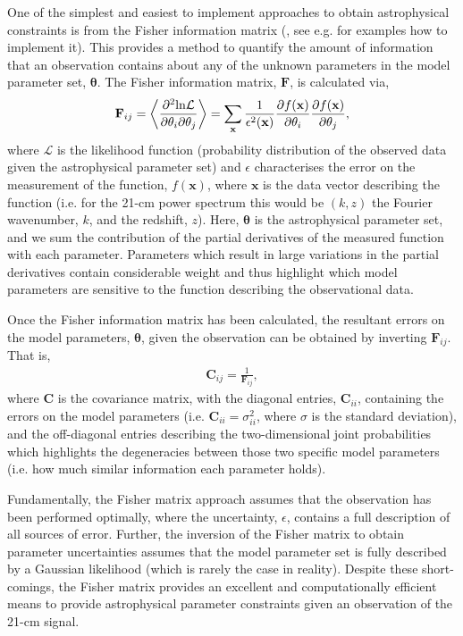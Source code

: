 One of the simplest and easiest to implement approaches to obtain astrophysical constraints is from the Fisher information matrix (\cite{Fisher:1935}, see e.g. \cite{Tegmark:1997,Coe:2009} for examples how to implement it). This provides a method to quantify the amount of information that an observation contains about any of the unknown parameters in the model parameter set, $\mathbf{\theta}$. The Fisher information matrix, $\mathbf{F}$, is calculated via,
\begin{eqnarray}
\mathbf{F}_{ij} = \left\langle \frac{\partial^{2}{\rm ln}\mathcal{L}}{\partial\theta_{i}\partial\theta_{j}} \right\rangle = \sum_{\mathbf{x}} \frac{1}{\epsilon^{2}(\mathbf{x})} \frac{\partial f(\mathbf{x})}{\partial\theta_{i}} \frac{\partial f(\mathbf{x})}{\partial\theta_{j}} ,
\end{eqnarray}
where $\mathcal{L}$ is the likelihood function (probability distribution of the observed data given the astrophysical parameter set) and $\epsilon$ characterises the error on the measurement of the function, $f(\mathbf{x})$, where $\mathbf{x}$ is the data vector describing the function (i.e. for the 21-cm power spectrum this would be $(k,z)$ the Fourier wavenumber, $k$, and the redshift, $z$). Here, $\mathbf{\theta}$ is the astrophysical parameter set, and we sum the contribution of the partial derivatives of the measured function with each parameter. Parameters which result in large variations in the partial derivatives contain considerable weight and thus highlight which model parameters are sensitive to the function describing the observational data.

Once the Fisher information matrix has been calculated, the resultant errors on the model parameters, $\mathbf{\theta}$, given the observation can be obtained by inverting $\mathbf{F}_{ij}$. That is,
\begin{eqnarray}
\mathbf{C}_{ij} = \frac{1}{\mathbf{F}_{ij}},
\end{eqnarray}
where $\mathbf{C}$ is the covariance matrix, with the diagonal entries, $\mathbf{C}_{ii}$, containing the errors on the model parameters (i.e. $\mathbf{C}_{ii} = \sigma^{2}_{ii}$, where $\sigma$ is the standard deviation), and the off-diagonal entries describing the two-dimensional joint probabilities which highlights the degeneracies between those two specific model parameters (i.e. how much similar information each parameter holds).

Fundamentally, the Fisher matrix approach assumes that the observation has been performed optimally, where the uncertainty, $\epsilon$, contains a full description of all sources of error. Further, the inversion of the Fisher matrix to obtain parameter uncertainties assumes that the model parameter set is fully described by a Gaussian likelihood (which is rarely the case in reality). Despite these short-comings, the Fisher matrix provides an excellent and computationally efficient means to provide astrophysical parameter constraints given an observation of the 21-cm signal.

